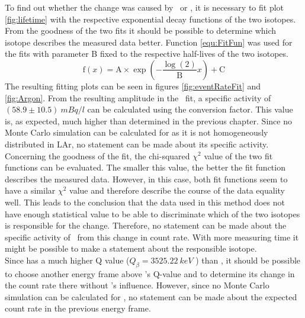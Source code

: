 \documentclass[encoding=utf8,british]{tumphthesis}
\begin{document}
To find out whether the change was caused by \Kr\ or , it is necessary to fit  plot \ref{fig:lifetime} with the respective exponential decay functions of the two isotopes.
From the goodness of the two fits it should be possible to determine which isotope describes the measured data better.
Function \ref{equ:FitFun} was used for the fits with parameter B fixed to the respective half-lives of the two isotopes.
\begin{equation}
\mathrm{f}(x) = \mathrm{A}\times\exp\left(-\frac{\log(2)}{\mathrm{B}} x \right) + \mathrm{C}
\label{equ:FitFun}
\end{equation}
The resulting fitting plots can be seen in figures \ref{fig:eventRateFit} and \ref{fig:Argon}.
From the resulting amplitude in the \Kr\ fit, a specific activity of $(58.9\pm10.5) \  \unit{mBq}/\unit{l}$ can be calculated using the conversion factor.
This value is, as expected, much higher than determined in the previous chapter.
Since no Monte Carlo simulation can be calculated for  as it is not homogeneously distributed in LAr, no statement can be made about its specific activity.
\\

Concerning the goodness of the fit, the chi-squared $\chi^2$ value of the two fit functions can be evaluated.
The smaller this value, the better the fit function describes  the measured data.
However, in this case, both fit functions seem to have a similar $\chi^2$ value and therefore describe the course of the data equality well.
This leads to the conclusion that the data used in this method does not have enough statistical value to be able to discriminate which of the two isotopes is responsible for the change.
Therefore, no statement can be made about the specific activity of \Kr\ from this change in count rate.
With more measuring time it might be possible to make a statement about the responsible isotope.
\\

Since  has a much higher Q value ($Q_{\beta} = 3525.22 \ \unit{keV}$ \cite{chen_nuclear_2016}) than \Kr, it should be possible to choose another energy frame above \Kr's Q-value and to determine its change in the count rate there without \Kr's influence.
However, since no Monte Carlo simulation can be calculated for , no statement can be made about the expected count rate in the previous energy frame.
\end{document}

